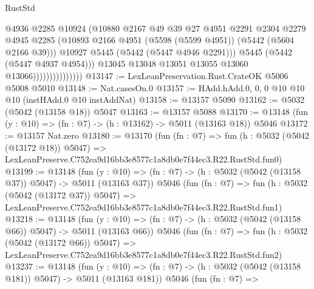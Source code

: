 \begin{lexlean}{RustStd}
\begin{coremodule}
                                    @4936
                                    @2285
                                    @10924
                                    (@10880
                                      @2167
                                      @49
                                      @39
                                      @27
                                      @4951
                                      @2291
                                      @2304
                                      @2279
                                      @4945
                                      @2285
                                      (@10893
                                        @2166
                                        @4951
                                        (@5598 (@5599 @4951))
                                        (@5442 (@5604 @2166 @39)))
                                      @10927
                                      @5445
                                      (@5442 (@5447 @4946 @2291)))
                                    @5445
                                    (@5442 (@5447 @4937 @4954)))
                                  @13045
                                  @13048
                                  @13051
                                  @13055
                                  @13060
                                  @13066)))))))))))))))
@13147 := LexLeanPreservation.Rust.CrateOK @5006 @5008 @5010
@13148 := Nat.casesOn.{0}
@13157 := HAdd.hAdd.{0, 0, 0} @10 @10 @10 (instHAdd.{0} @10 instAddNat)
@13158 := @13157 @5090
@13162 := @5032 (@5042 (@13158 @18)) @5047
@13163 := @13157 @5088
@13170 := @13148 (fun (y : @10) => (fn : @7) -> (h : @13162) -> @5011 (@13163 @18)) @5046
@13172 := @13157 Nat.zero
@13180 := @13170
    (fun (fn : @7) =>
    fun (h : @5032 (@5042 (@13172 @18)) @5047) =>
    LexLeanPreserve.C752ea9d16bb3e8577c1a8db0e7f44ec3.R22.RustStd.fun0)
@13199 := @13148
    (fun (y : @10) => (fn : @7) -> (h : @5032 (@5042 (@13158 @37)) @5047) -> @5011 (@13163 @37))
    @5046
    (fun (fn : @7) =>
    fun (h : @5032 (@5042 (@13172 @37)) @5047) =>
    LexLeanPreserve.C752ea9d16bb3e8577c1a8db0e7f44ec3.R22.RustStd.fun1)
@13218 := @13148
    (fun (y : @10) => (fn : @7) -> (h : @5032 (@5042 (@13158 @66)) @5047) -> @5011 (@13163 @66))
    @5046
    (fun (fn : @7) =>
    fun (h : @5032 (@5042 (@13172 @66)) @5047) =>
    LexLeanPreserve.C752ea9d16bb3e8577c1a8db0e7f44ec3.R22.RustStd.fun2)
@13237 := @13148
    (fun (y : @10) => (fn : @7) -> (h : @5032 (@5042 (@13158 @181)) @5047) -> @5011 (@13163 @181))
    @5046
    (fun (fn : @7) =>

\end{coremodule}
\end{lexlean}
